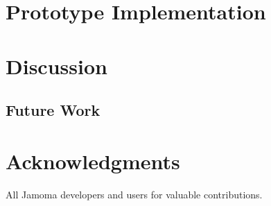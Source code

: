 \documentclass{sig-alternate}
\begin{document}
\section{Prototype Implementation}



\section{Discussion}


\subsection{Future Work}



\section{Acknowledgments}
All Jamoma developers and users for valuable contributions. 


%

%


\balancecolumns %
\end{document}
